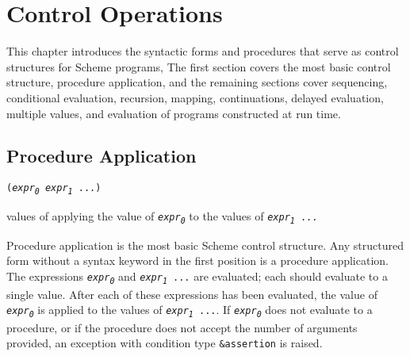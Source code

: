 \chapter{Control Operations\label{control_CHPTCONTROL}}
\label{control_g96}
\label{control_h0}
\begin{figure}[H]
\centering
\setlength{\fboxrule}{3pt}
\end{figure}
\clearpage





This chapter introduces the syntactic forms and procedures that
serve as \label{control_s0}control structures for Scheme programs,
The first section covers the most basic control structure, procedure
application, and the remaining sections cover sequencing, conditional
evaluation, recursion, mapping, continuations, delayed evaluation,
multiple values, and evaluation of programs constructed at run time.


\section{\label{control_g97}\label{control_h1}Procedure Application\label{control_SECTAPPLICATION}}


\begin{description}

\label{control_s1}\item[syntax] \texttt{(\textit{expr\textsubscript{0}} \textit{expr\textsubscript{1}} ...)}



\item[returns] values of applying the value of \texttt{\textit{expr\textsubscript{0}}} to the values of \texttt{\textit{expr\textsubscript{1}} ...}
\end{description}


Procedure application is the most basic Scheme control structure.
Any structured form without a syntax keyword in the first position is a
procedure application.
The expressions \texttt{\textit{expr\textsubscript{0}}} and \texttt{\textit{expr\textsubscript{1}} ...} are evaluated; each
should evaluate to a single value.
After each of these expressions has been evaluated, the value of
\texttt{\textit{expr\textsubscript{0}}} is applied to the values of \texttt{\textit{expr\textsubscript{1}} ...}.
If \texttt{\textit{expr\textsubscript{0}}} does not evaluate to a procedure, or if the procedure does not
accept the number of arguments provided, an exception with condition type
\texttt{\&{}assertion} is raised.


